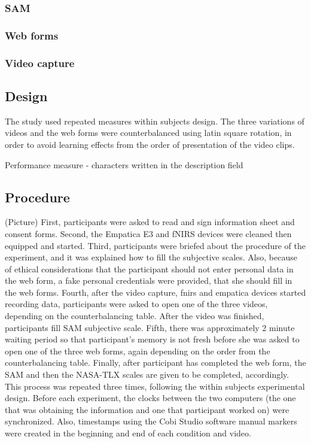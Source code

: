 \documentclass[a4paper]{report}
\begin{document}
			\subsubsection{SAM}
			\subsubsection{Web forms}
			\subsubsection{Video capture}
		\subsection{Design}
		The study used repeated measures within subjects design. The three variations of videos and the web forms were counterbalanced using latin square rotation, in order to avoid learning effects from the order of presentation of the video clips.
		
		Performance measure - characters written in the description field
		\subsection{Procedure}
		(Picture)
		First, participants were asked to read and sign information sheet and consent forms. Second, the Empatica E3 and fNIRS devices were cleaned then equipped and started. Third, participants were briefed about the procedure of the experiment, and it was explained how to fill the subjective scales. Also, because of ethical considerations that the participant should not enter personal data in the web form, a fake personal credentials were provided, that she should fill in the web forms. Fourth, after the video capture, fnirs and empatica devices started recording data, participants were asked to open one of the three videos, depending on the counterbalancing table. After the video was finished, participants fill SAM subjective scale. Fifth, there was approximately 2 minute waiting period so that participant's memory is not fresh before she was asked to open one of the three web forms, again depending on the order from the counterbalancing table. Finally, after participant has completed the web form, the SAM and then the NASA-TLX scales are given to be completed, accordingly. This process was repeated three times, following the within subjects experimental design.
		Before each experiment, the clocks between the two computers (the one that was obtaining the information and one that participant worked on) were synchronized. Also, timestamps using the Cobi Studio software manual markers were created in the beginning and end of each condition and video. 
\end{document}
